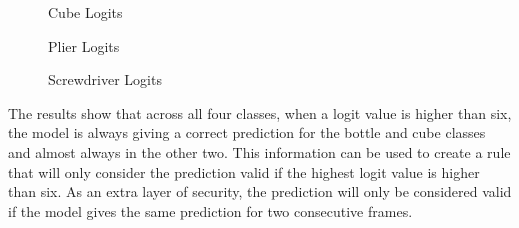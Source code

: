 \begin{figure}[H]
    \centering
    {\fontsize{9}{11}\selectfont}
    \caption{Cube Logits}
    \label{fig:cube_logits}
\end{figure}

\begin{figure}[H]
    \centering
    {\fontsize{9}{11}\selectfont}
    \caption{Plier Logits}
    \label{fig:plier_logits}
\end{figure}

\begin{figure}[H]
    \centering
    {\fontsize{9}{11}\selectfont}
    \caption{Screwdriver Logits}
    \label{fig:screw_logits}
\end{figure}

The results show that across all four classes, when a logit value is higher than six, the model is always giving a correct prediction for the bottle and cube classes and almost always in the other two. This information can be used to create a rule that will only consider the prediction valid if the highest logit value is higher than six. As an extra layer of security, the prediction will only be considered valid if the model gives the same prediction for two consecutive frames. 
